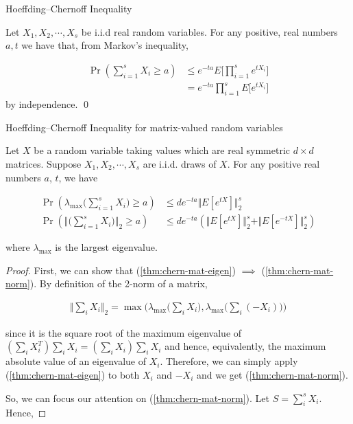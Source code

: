 \documentclass[main.tex]{subfiles}
\begin{document}
{\begin{subappendices}
\begin{lemma}Hoeffding--Chernoff Inequality
\label{lem:chernoff}

Let $X_1, X_2, \cdots, X_s$	be i.i.d real random variables. For any positive, real numbers $a, t$ we have that, from Markov's inequality,

\begin{align*}
\Pr(\sum_{i=1}^s X_i \geq a) &\leq e^{-ta} E\Bigg[\prod_{i=1}^s e^{tX_i}\Bigg]\\
&= e^{-ta} \prod_{i=1}^s E\Bigg[e^{tX_i}\Bigg]
\end{align*}
by independence.
\qed
\end{lemma}

\begin{theorem}Hoeffding--Chernoff Inequality for matrix-valued random variables \cite{kannan2017randomized}
	
	Let $X$ be a random variable taking values which are real symmetric $d \times d$ matrices. Suppose $X_1, X_2, \cdots , X_s$ are i.i.d. draws of $X$. For any positive real numbers $a$, $t$, we have
	
	\begin{align}
		\label{thm:chern-mat-eigen}
		\Pr(\lambda_{\max}\Big(\sum_{i=1}^s X_i\Big) \geq a ) &\leq de^{-ta} \Vert E[e^{tX}]\Vert_2^s \\
		\label{thm:chern-mat-norm}
		\Pr(\Big\Vert \Big(\sum_{i=1}^s X_i\Big)\Big\Vert_2 \geq a ) &\leq de^{-ta} (\Vert E[e^{tX}]\Vert_2^s + \Vert E[e^{-tX}]\Vert_2^s)
	\end{align}
	
	where $\lambda_{\max}$ is the largest eigenvalue.
	\begin{proof}
		First, we can show that (\ref{thm:chern-mat-eigen}) $\implies$ (\ref{thm:chern-mat-norm}). By definition of the 2-norm of a matrix,
		
		\begin{align*}
		\Vert \sum_i X_i \Vert_2 = \max\Big(\lambda_{\max} \Big(\sum_i X_i\Big), \lambda_{\max} \Big(\sum_i (-X_i)\Big)\Big)	
		\end{align*}
		
		since it is the square root of the maximum eigenvalue of $(\sum_i X_i^T) \sum_i X_i = (\sum_i X_i) \sum_i X_i$ and hence, equivalently, the maximum absolute value of an eigenvalue of $X_i$. Therefore, we can simply apply (\ref{thm:chern-mat-eigen}) to both $X_i$ and $-X_i$ and we get (\ref{thm:chern-mat-norm}).
		
		So, we can focus our attention on (\ref{thm:chern-mat-norm}). Let $S = \sum_i^s X_i$. Hence,
		

\end{proof}
\end{theorem}
\end{subappendices}}
\end{document}
